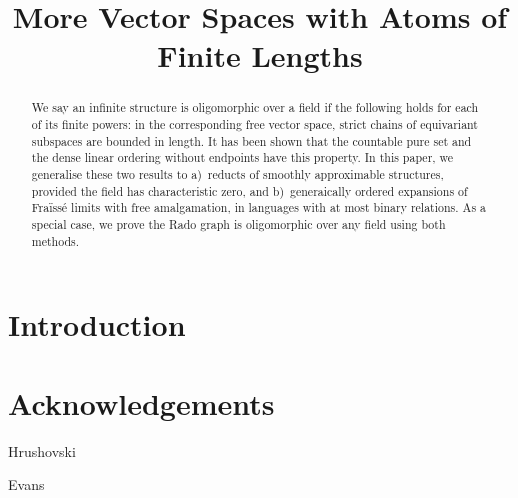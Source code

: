 \documentclass[conference]{IEEEtran}
\theoremstyle{definition}
\theoremstyle{remark}
\begin{document}
\title{More Vector Spaces with Atoms of Finite Lengths
}

\author{

\and

\and
}

\maketitle

\begin{abstract}
    We say an infinite structure is oligomorphic over a field 
    if the following holds for each of its finite powers:
    in the corresponding free vector space, strict chains of equivariant subspaces are bounded in length.
    It has been  shown that the countable pure set and the dense linear ordering without endpoints have this property.
    In this paper, we generalise these two results to
    a)~reducts of smoothly approximable structures, provided the field has characteristic zero, and
    b)~generaically ordered expansions of Fraïssé limits with free amalgamation, in languages with at most binary relations.
    As a special case, we prove the Rado graph is oligomorphic over any field using both methods.
\end{abstract}


\section{Introduction}





\section*{Acknowledgements}
Hrushovski

Evans

\printbibliography
\end{document}
